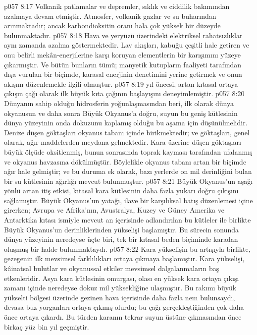 \vs p057 8:17 Volkanik patlamalar ve depremler, sıklık ve ciddilik bakımından azalmaya devam etmiştir. Atmosfer, volkanik gazlar ve su buharından arınmaktadır; ancak karbondioksitin oranı hala çok yüksek bir düzeyde bulunmaktadır.
\vs p057 8:18 Hava ve yeryüzü üzerindeki elektriksel rahatsızlıklar aynı zamanda azalma göstermektedir. Lav akışları, kabuğu çeşitli hale getiren ve onu belirli mekân\hyp{}enerjilerine karşı koruyan elementlerin bir karışımını yüzeye çıkarmıştır. Ve bütün bunların tümü; manyetik kutupların faaliyeti tarafından dışa vurulan bir biçimde, karasal enerjinin denetimini yerine getirmek ve onun akışını düzenlemekle ilgili olmuştur.
\vs p057 8:19  yıl öncesi, artan kıtasal ortaya çıkışın çağı olarak ilk büyük kıta çağının başlayışını deneyimlemiştir.
\vs p057 8:20 Dünyanın sahip olduğu hidrosferin yoğunlaşmasından beri, ilk olarak dünya okyanusun ve daha sonra Büyük Okyanus’a doğru, suyun bu geniş kütlesinin dünya yüzeyinin onda dokuzunu kaplamış olduğu bu aşama için düşünülmelidir. Denize düşen göktaşları okyanus tabanı içinde birikmektedir; ve göktaşları, genel olarak, ağır maddelerden meydana gelmektedir. Kara üzerine düşen göktaşları büyük ölçüde oksitlenmiş, bunun sonrasında toprak kayması tarafından ufalanmış ve okyanus havzasına dökülmüştür. Böylelikle okyanus tabanı artan bir biçimde ağır hale gelmiştir; ve bu duruma ek olarak, bazı yerlerde on mil derinliğini bulan bir su kütlesinin ağırlığı mevcut bulunmuştur.
\vs p057 8:21 Büyük Okyanus’un aşağı yönlü artan itiş etkisi, kıtasal kara kütlesinin daha fazla yukarı doğru çıkışını sağlamıştır. Büyük Okyanus’un yatağı, ilave bir karşılıksal batış düzenlemesi içine girerken; Avrupa ve Afrika’nın, Avustralya, Kuzey ve Güney Amerika ve Antarktika kıtası ismiyle mevcut an içerisinde adlandırılan bu kütleler ile birlikte Büyük Okyanus’un derinliklerinden yükselişi başlamıştır. Bu sürecin sonunda dünya yüzeyinin neredeyse üçte biri, tek bir kıtasal beden biçiminde karadan oluşmuş bir halde bulunmaktaydı.
\vs p057 8:22 Kara yükselişin bu artışıyla birlikte, gezegenin ilk mevsimsel farklılıkları ortaya çıkmaya başlamıştır. Kara yükselişi, kâinatsal bulutlar ve okyanussal etkiler mevsimsel dalgalanmaların baş etkenleridir. Asya kara kütlesinin omurgası, olası en yüksek kara ortaya çıkışı zamanı içinde neredeyse dokuz mil yüksekliğine ulaşmıştır. Bu rakımı büyük yükselti bölgesi üzerinde gezinen hava içerisinde daha fazla nem bulunsaydı, devasa buz yorganları ortaya çıkmış olurdu; bu çağı gerçekleştiğinden çok daha önce ortaya çıkardı. Bu türden karanın tekrar suyun üstüne çıkmasından önce birkaç yüz bin yıl geçmiştir.
